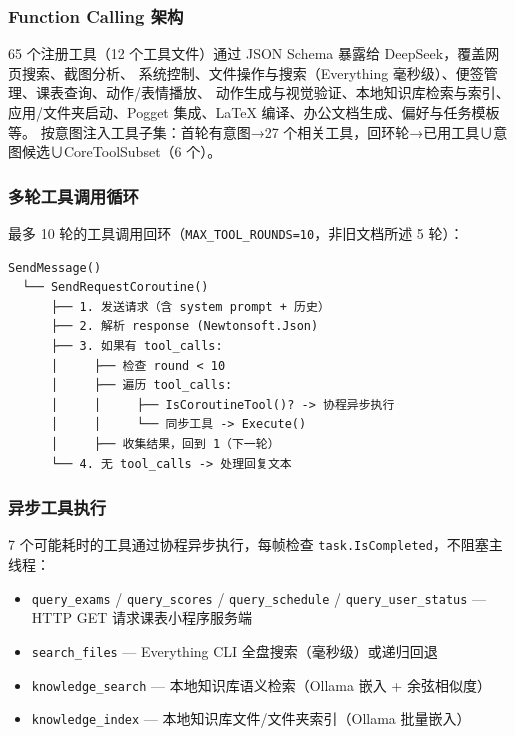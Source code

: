 \documentclass[12pt,a4paper]{ctexart}
\begin{document}
\subsubsection{Function Calling 架构}

65 个注册工具（12 个工具文件）通过 JSON Schema 暴露给 DeepSeek，覆盖网页搜索、截图分析、
系统控制、文件操作与搜索（Everything 毫秒级）、便签管理、课表查询、动作/表情播放、
动作生成与视觉验证、本地知识库检索与索引、应用/文件夹启动、Pogget 集成、LaTeX 编译、办公文档生成、偏好与任务模板等。
按意图注入工具子集：首轮有意图→27 个相关工具，回环轮→已用工具∪意图候选∪CoreToolSubset（6 个）。

\subsubsection{多轮工具调用循环}

最多 10 轮的工具调用回环（\texttt{MAX\_TOOL\_ROUNDS=10}，非旧文档所述 5 轮）：

\begin{lstlisting}[style=csharp,caption={多轮工具调用循环},label={lst:tool-loop}]
SendMessage()
  └── SendRequestCoroutine()
      ├── 1. 发送请求（含 system prompt + 历史）
      ├── 2. 解析 response (Newtonsoft.Json)
      ├── 3. 如果有 tool_calls:
      │     ├── 检查 round < 10
      │     ├── 遍历 tool_calls:
      │     │     ├── IsCoroutineTool()? -> 协程异步执行
      │     │     └── 同步工具 -> Execute()
      │     ├── 收集结果，回到 1（下一轮）
      └── 4. 无 tool_calls -> 处理回复文本
\end{lstlisting}

\subsubsection{异步工具执行}

7 个可能耗时的工具通过协程异步执行，每帧检查 \texttt{task.IsCompleted}，不阻塞主线程：

\begin{itemize}
    \item \texttt{query\_exams} / \texttt{query\_scores} / \texttt{query\_schedule} / \texttt{query\_user\_status}
          --- HTTP GET 请求课表小程序服务端
    \item \texttt{search\_files} --- Everything CLI 全盘搜索（毫秒级）或递归回退
    \item \texttt{knowledge\_search} --- 本地知识库语义检索（Ollama 嵌入 + 余弦相似度）
    \item \texttt{knowledge\_index} --- 本地知识库文件/文件夹索引（Ollama 批量嵌入）
\end{itemize}
\end{document}
